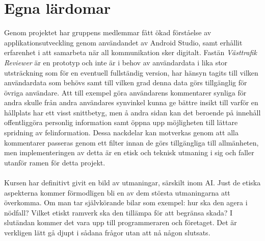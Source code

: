 \documentclass{article}
\begin{document}
\section*{Egna lärdomar}
Genom projektet har gruppens medlemmar fått ökad förståelse av applikationsutveckling genom användandet av Android Studio, samt erhållit erfarenhet i att samarbeta när all kommunikation sker digitalt. Fastän \textit{Västtrafik Reviewer} är en prototyp och inte är i behov av användardata i lika stor utsträckning som för en eventuell fullständig version, har hänsyn tagits till vilken användardata som behövs samt till vilken grad denna data görs tillgänglig för övriga användare. Att till exempel göra användarens kommentarer synliga för andra skulle från andra användares synvinkel kunna ge bättre insikt till varför en hållplats har ett visst snittbetyg, men å andra sidan kan det beroende på innehåll offentliggöra personlig information samt öppna upp möjligheten till lättare spridning av felinformation. Dessa nackdelar kan motverkas genom att alla kommentarer passeras genom ett filter innan de görs tillgängliga till allmänheten, men implementeringen av detta är en etisk och teknisk utmaning i sig och faller utanför ramen för detta projekt.
\\\\
Kursen har definitivt givit en bild av utmaningar, särskilt inom AI. Just de etiska aspekterna kommer förmodligen bli en av dem största utmaningarna att överkomma. Om man tar självkörande bilar som exempel: hur ska den agera i nödfall? Vilket etiskt ramverk ska den tillämpa för att begränsa skada? I slutändan kommer det vara upp till programmeraren och företaget. Det är verkligen lätt gå djupt i sådana frågor utan att nå någon slutsats.
\end{document}

